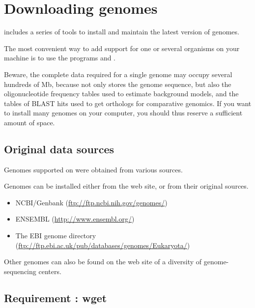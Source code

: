 
\chapter{Downloading genomes}
\label{downloading_genomes}

\RSAT includes a series of tools to install and maintain the latest
version of genomes.

The most convenient way to add support for one or several organisms on
your machine is to use the programs  and
.

Beware, the complete data required for a single genome may occupy
several hundreds of Mb, because \RSAT not only stores the genome
sequence, but also the oligonucleotide frequency tables used to
estimate background models, and the tables of BLAST hits used to get
orthologs for comparative genomics. If you want to install many
genomes on your computer, you should thus reserve a sufficient amount
of space.

\section{Original data sources}

Genomes supported on \RSAT were obtained from various sources.

Genomes can be installed either from the \RSAT web site, or from their
original sources.  

\begin{itemize}
\item NCBI/Genbank (\url{ftp://ftp.ncbi.nih.gov/genomes/})

\item ENSEMBL (\url{http://www.ensembl.org/})

\item The EBI genome directory (\url{ftp://ftp.ebi.ac.uk/pub/databases/genomes/Eukaryota/})

\end{itemize}

Other genomes can also be found on the web site of a diversity of
genome-sequencing centers.

\section{Requirement : wget}

